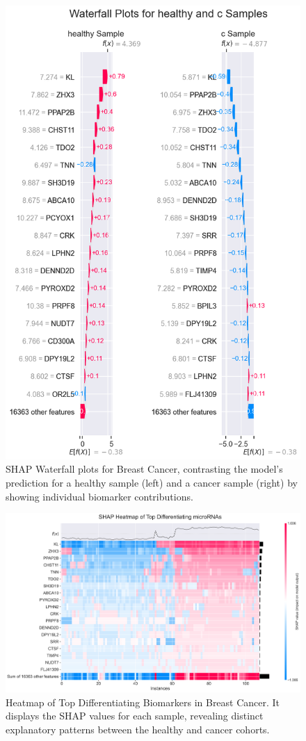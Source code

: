 \documentclass[journal]{IEEEtran}
\begin{document}
\begin{figure}[htbp]
\centering
\includegraphics[width=0.8\linewidth]{breast_cancer_figures/differential/shap_waterfall_subplots_healthy_and_c.png}
\caption{SHAP Waterfall plots for Breast Cancer, contrasting the model's prediction for a healthy sample (left) and a cancer sample (right) by showing individual biomarker contributions.}
\label{fig:breast_shap_waterfall}
\end{figure}

\begin{figure}[!htbp]
\centering
\includegraphics[width=\linewidth]{breast_cancer_figures/differential/shap_heatmap_plot_healthy_and_c.png}
\caption{Heatmap of Top Differentiating Biomarkers in Breast Cancer. It displays the SHAP values for each sample, revealing distinct explanatory patterns between the healthy and cancer cohorts.}
\label{fig:breast_heatmap}
\end{figure}
\end{document}

